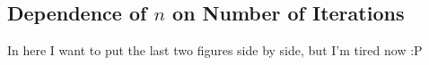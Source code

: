 \subsection{Dependence of $n$ on Number of Iterations}
\label{subsec:DependenceOnNumberOfIterations}

In here I want to put the last two figures side by side, but I'm tired now :P